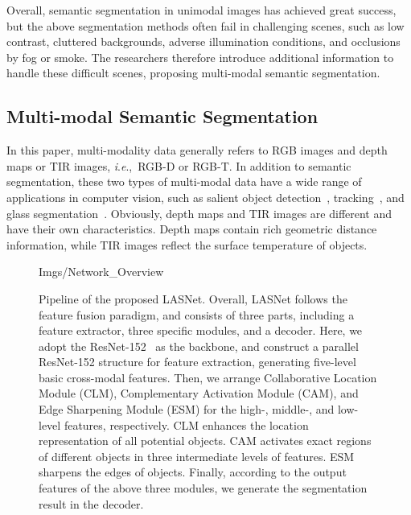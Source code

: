 \documentclass[journal]{IEEEtran}
\newcommand{\ie}{\textit{i}.\textit{e}.,~}
\begin{document}
Overall, semantic segmentation in unimodal images has achieved great success, but the above segmentation methods often fail in challenging scenes, such as low contrast, cluttered backgrounds, adverse illumination conditions, and occlusions by fog or smoke.
The researchers therefore introduce additional information to handle these difficult scenes, proposing multi-modal semantic segmentation.


\subsection{Multi-modal Semantic Segmentation}
\label{sec:CNN_ORSI_SOD}
In this paper, multi-modality data generally refers to RGB images and depth maps or TIR images, \ie RGB-D or RGB-T.
In addition to semantic segmentation, these two types of multi-modal data have a wide range of applications in computer vision, such as salient object detection~\cite{VT821,20CMWNet,20ICNet,21HAINet}, tracking~\cite{RGBTTracking}, and glass segmentation~\cite{RGBTGlass,RGBDGlass}.
Obviously, depth maps and TIR images are different and have their own characteristics.
Depth maps contain rich geometric distance information, while TIR images reflect the surface temperature of objects.


\begin{figure*}
	\centering
	\begin{overpic}[width=0.85\textwidth]{Imgs/Network_Overview}
    \end{overpic}
	\caption{Pipeline of the proposed LASNet.
	 Overall, LASNet follows the feature fusion paradigm, and consists of three parts, including a feature extractor, three specific modules, and a decoder.
	 Here, we adopt the ResNet-152~\cite{2016ResNet} as the backbone, and construct a parallel ResNet-152 structure for feature extraction, generating five-level basic cross-modal features.
	 Then, we arrange Collaborative Location Module (CLM),  Complementary Activation Module (CAM), and Edge Sharpening Module (ESM) for the high-, middle-, and low-level features, respectively.
	 CLM enhances the location representation of all potential objects.
	 CAM activates exact regions of different objects in three intermediate levels of features.
	 ESM sharpens the edges of objects.
	 Finally, according to the output features of the above three modules, we generate the segmentation result  in the decoder.
    }
    \label{fig:Framework}
\end{figure*}
\end{document}
